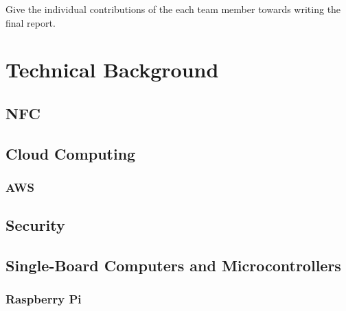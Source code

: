 \documentclass[12pt]{report}
\begin{document}
Give the individual contributions of the each team member towards writing the
final report.


\chapter{Technical Background}


\section{NFC}


\section{Cloud Computing}



\subsection{AWS}


\section{Security}


\section{Single-Board Computers and Microcontrollers}


\subsection{Raspberry Pi}
\end{document}
